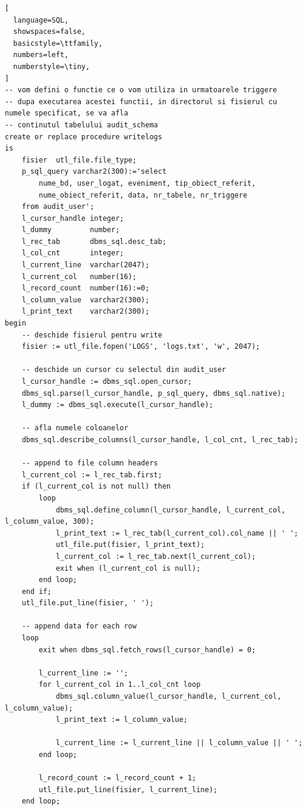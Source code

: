 \documentclass[12pt]{article}
\begin{document}
\begin{lstlisting}[
  language=SQL,
  showspaces=false,
  basicstyle=\ttfamily,
  numbers=left,
  numberstyle=\tiny,
]
-- vom defini o functie ce o vom utiliza in urmatoarele triggere
-- dupa executarea acestei functii, in directorul si fisierul cu numele specificat, se va afla
-- continutul tabelului audit_schema
create or replace procedure writelogs
is
    fisier  utl_file.file_type;
    p_sql_query varchar2(300):='select 
        nume_bd, user_logat, eveniment, tip_obiect_referit,
        nume_obiect_referit, data, nr_tabele, nr_triggere
    from audit_user';
    l_cursor_handle integer;
    l_dummy         number;
    l_rec_tab       dbms_sql.desc_tab;
    l_col_cnt       integer;
    l_current_line  varchar(2047);
    l_current_col   number(16);
    l_record_count  number(16):=0;
    l_column_value  varchar2(300);
    l_print_text    varchar2(300);
begin
    -- deschide fisierul pentru write
    fisier := utl_file.fopen('LOGS', 'logs.txt', 'w', 2047);
    
    -- deschide un cursor cu selectul din audit_user
    l_cursor_handle := dbms_sql.open_cursor;
    dbms_sql.parse(l_cursor_handle, p_sql_query, dbms_sql.native);
    l_dummy := dbms_sql.execute(l_cursor_handle);
    
    -- afla numele coloanelor
    dbms_sql.describe_columns(l_cursor_handle, l_col_cnt, l_rec_tab);
    
    -- append to file column headers
    l_current_col := l_rec_tab.first;
    if (l_current_col is not null) then
        loop
            dbms_sql.define_column(l_cursor_handle, l_current_col, l_column_value, 300);
            l_print_text := l_rec_tab(l_current_col).col_name || ' ';
            utl_file.put(fisier, l_print_text);
            l_current_col := l_rec_tab.next(l_current_col);
            exit when (l_current_col is null);
        end loop;
    end if;
    utl_file.put_line(fisier, ' ');
    
    -- append data for each row
    loop
        exit when dbms_sql.fetch_rows(l_cursor_handle) = 0;
        
        l_current_line := '';
        for l_current_col in 1..l_col_cnt loop
            dbms_sql.column_value(l_cursor_handle, l_current_col, l_column_value);
            l_print_text := l_column_value;
            
            l_current_line := l_current_line || l_column_value || ' ';
        end loop;
        
        l_record_count := l_record_count + 1;
        utl_file.put_line(fisier, l_current_line);
    end loop;
    

\end{lstlisting}
\end{document}
